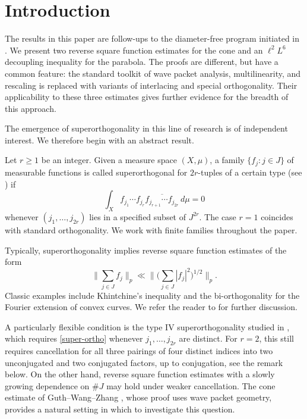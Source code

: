\documentclass{amsart}
\numberwithin{equation}{section}
\begin{document}
\maketitle

\section{Introduction}

The results in this paper are follow-ups to the diameter-free program initiated in \cite{Cushman-Demeter-Wu}. 
We present two reverse square function estimates for the cone and an $\ell^2L^6$ decoupling inequality for the parabola. 
The proofs are different, but have a common feature: the standard toolkit of wave packet analysis, multilinearity, and rescaling is replaced with variants of interlacing and special orthogonality. 
Their applicability to these three estimates gives further evidence for the breadth of this approach.

\smallskip 

The emergence of superorthogonality in this line of research is of independent interest. 
We therefore begin with an abstract result.

Let $r\geq1$ be an integer. Given a measure space $(X,\mu)$, a family
$\{f_j:j\in J\}$ of measurable functions is called superorthogonal for
$2r$-tuples of a certain type (see
\cite{Pierce-superorthogonality,GPRY}) if
\begin{equation}
\label{super-ortho}
    \int_X f_{j_1}\cdots f_{j_r}
    \overline{f_{j_{r+1}}\cdots f_{j_{2r}}}\,d\mu=0
\end{equation}
whenever $(j_1,\ldots,j_{2r})$ lies in a specified subset of $J^{2r}$.
The case $r=1$ coincides with standard orthogonality.
We work with finite families throughout the paper.

Typically, superorthogonality implies reverse square function estimates of the form
\begin{equation}
\nonumber
    \Big\|\sum_{j\in J}f_j\Big\|_p
    \ll \Big\|\Big(\sum_{j\in J}|f_j|^2\Big)^{1/2}\Big\|_p.
\end{equation}
Classic examples include Khintchine's inequality and the bi-orthogonality for the Fourier extension of convex curves.
We refer the reader to \cite{Pierce-superorthogonality,GPRY} for further discussion.

\smallskip

A particularly flexible condition is the type IV superorthogonality studied in \cite{GPRY}, which requires \eqref{super-ortho} whenever $j_1,\ldots,j_{2r}$ are distinct. 
For $r=2$, this still requires cancellation for all three pairings of four distinct indices into two unconjugated and two conjugated factors, up to conjugation, see the remark below. 
On the other hand, reverse square function estimates with a slowly growing dependence on $\#J$ may hold under weaker cancellation.
The cone estimate of Guth--Wang--Zhang \cite{GWZ}, whose proof uses wave packet geometry, provides a natural setting in which to investigate this question.
\end{document}
